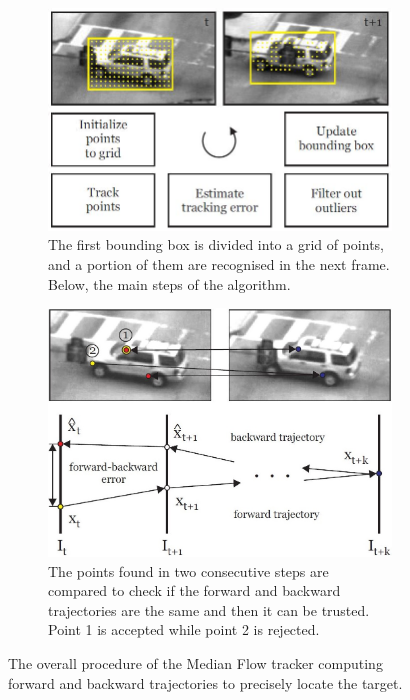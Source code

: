 \begin{figure}[!h]
	\centering
	\begin{subfigure}{0.49\textwidth}
		\includegraphics[width=\linewidth]{images/tracking/howItWorks_medianFlow_points}
		\caption{The first bounding box is divided into a grid of points, and a portion of them are recognised in the next frame. Below, the main steps of the algorithm.}
		\label{fig:howItWorks_medianFlow_points}
	\end{subfigure}
	\begin{subfigure}{0.49\textwidth}
		\includegraphics[width=\linewidth]{images/tracking/howItWorks_medianFlow_trajectory}
		\caption{The points found in two consecutive steps are compared to check if the forward and backward trajectories are the same and then it can be trusted.\\ Point 1 is accepted while point 2 is rejected.}
		\label{fig:howItWorks_medianFlow_trajectory}
	\end{subfigure}
	\caption{The overall procedure of the Median Flow tracker computing forward and backward trajectories to precisely locate the target.}
	\label{fig:howItWorks_medianFlow}
\end{figure}


